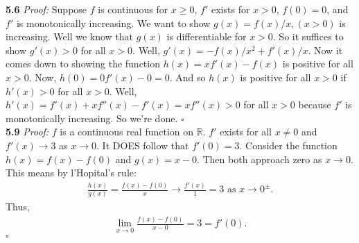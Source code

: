 \documentclass[11pt]{article}
\begin{document}
\noindent \textbf{5.6}
\noindent \textit{Proof:} Suppose $f$ is continuous for $x \geq 0$, $f'$ exists for $x > 0$, $f(0) = 0$, and $f'$ is monotonically increasing. We want to show $g(x)= f(x)/x, (x>0)$ is increasing. Well we know that $g(x)$ is differentiable for $x>0$. So it suffices to show $g'(x) > 0$ for all $x>0$. Well, $g'(x) = -f(x)/x^2+f'(x)/x$. Now it comes down to showing the function $h(x) = xf'(x) - f(x)$ is positive for all $x > 0$. Now, $h(0) = 0f'(x) - 0 = 0$. And so $h(x)$ is positive for all $x>0$ if $h'(x) > 0$ for all $x>0$. Well, $h'(x) = f'(x) + xf''(x) - f'(x) = xf''(x) > 0$ for all $x > 0$ because $f'$ is monotonically increasing. So we're done.  \hfill $\square$\\



\noindent \textbf{5.9}
\noindent \textit{Proof:} $f$ is a continuous real function on $\mathbb{R}$. $f'$ exists for all $x\neq 0$ and $f'(x) \to 3$ as $x\to 0$. It DOES follow that $f'(0) = 3$. Consider the function $h(x) = f(x) - f(0)$ and $g(x) = x-0$. Then both approach zero as $x\to 0$. This means by l'Hopital's rule:
\begin{align*}
\frac{h(x)}{g(x)} = \frac{f(x) - f(0)}{x} \to \frac{f'(x)}{1} = 3 \mbox{ as } x\to 0^{\pm}.
\end{align*}
Thus, 
\begin{align*}
\lim_{x\to 0} \frac{f(x) - f(0)}{x-0} = 3 = f'(0). 
\end{align*}
\hfill $\square$\\
\end{document}
